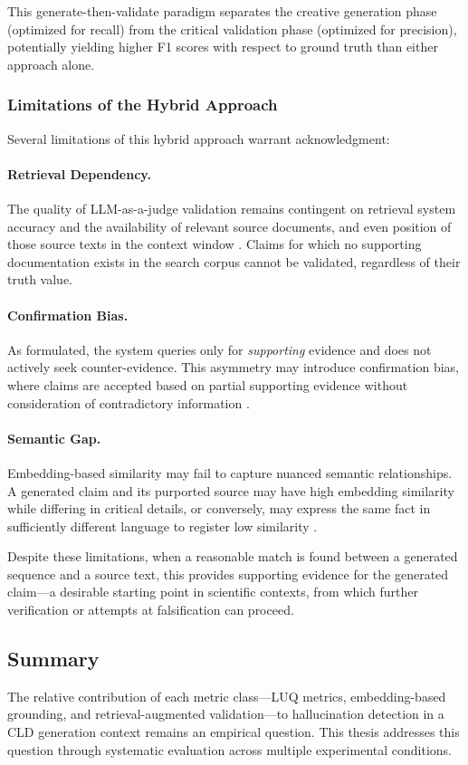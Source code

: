 This generate-then-validate paradigm separates the creative generation phase (optimized for recall) from the critical validation phase (optimized for precision), potentially yielding higher F1 scores with respect to ground truth than either approach alone.

\subsubsection{Limitations of the Hybrid Approach}

Several limitations of this hybrid approach warrant acknowledgment:

\paragraph{Retrieval Dependency.} The quality of LLM-as-a-judge validation remains contingent on retrieval system accuracy and the availability of relevant source documents, and even position of those source texts in the context window \citep{liu2023lostmiddle}. Claims for which no supporting documentation exists in the search corpus cannot be validated, regardless of their truth value.

\paragraph{Confirmation Bias.} As formulated, the system queries only for \textit{supporting} evidence and does not actively seek counter-evidence. This asymmetry may introduce confirmation bias, where claims are accepted based on partial supporting evidence without consideration of contradictory information \citep{nickerson1998confirmationbias}.

\paragraph{Semantic Gap.} Embedding-based similarity may fail to capture nuanced semantic relationships. A generated claim and its purported source may have high embedding similarity while differing in critical details, or conversely, may express the same fact in sufficiently different language to register low similarity \citep{wang2022sncsecontrastivelearningunsupervised}.

\noindent Despite these limitations, when a reasonable match is found between a generated sequence and a source text, this provides supporting evidence for the generated claim---a desirable starting point in scientific contexts, from which further verification or attempts at falsification can proceed. 

\subsection{Summary}

The relative contribution of each metric class---LUQ metrics, embedding-based grounding, and retrieval-augmented validation---to hallucination detection in a CLD generation context remains an empirical question. This thesis addresses this question through systematic evaluation across multiple experimental conditions.
